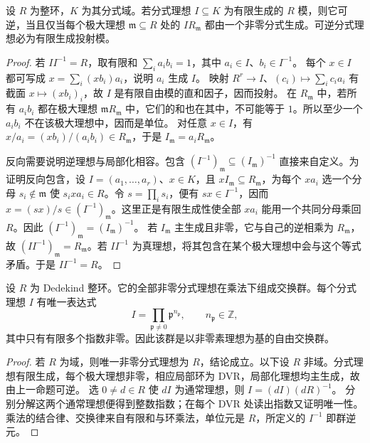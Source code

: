 \begin{proposition}\label{b3:prop:invertible-local-principal}
	设 \(R\) 为整环，\(K\) 为其分式域。若分式理想 \(I\subseteq K\) 为有限生成的 \(R\) 模，则它可逆，当且仅当每个极大理想 \(\mathfrak m\subseteq R\) 处的 \(IR_{\mathfrak m}\) 都由一个非零分式生成。可逆分式理想必为有限生成投射模。
\end{proposition}
\begin{proof}
	若 \(II^{-1}=R\)，取有限和 \(\sum_i a_ib_i=1\)，其中 \(a_i\in I\)、\(b_i\in I^{-1}\)。 每个 \(x\in I\) 都可写成 \(x=\sum_i (xb_i)a_i\)，说明 \(a_i\) 生成 \(I\)。 映射 \(R^r\rightarrow I\)、\((c_i)\mapsto\sum_i c_ia_i\) 有截面 \(x\mapsto(xb_i)_i\)，故 \(I\) 是有限自由模的直和因子，因而投射。 在 \(R_{\mathfrak m}\) 中，若所有 \(a_ib_i\) 都在极大理想 \(\mathfrak mR_{\mathfrak m}\) 中，它们的和也在其中，不可能等于 \(1\)。所以至少一个 \(a_ib_i\) 不在该极大理想中，因而是单位。 对任意 \(x\in I\)，有 \(x/a_i=(xb_i)/(a_ib_i)\in R_{\mathfrak m}\)，于是 \(I_{\mathfrak m}=a_iR_{\mathfrak m}\)。

	反向需要说明逆理想与局部化相容。包含 \((I^{-1})_{\mathfrak m}\subseteq(I_{\mathfrak m})^{-1}\) 直接来自定义。为证明反向包含，设 \(I=(a_1,\ldots,a_r)\)、\(x\in K\)，且 \(xI_{\mathfrak m}\subseteq R_{\mathfrak m}\)，为每个 \(xa_i\) 选一个分母 \(s_i\notin\mathfrak m\) 使 \(s_ix a_i\in R\)。令 \(s=\prod_i s_i\)，便有 \(sx\in I^{-1}\)，因而 \(x=(sx)/s\in(I^{-1})_{\mathfrak m}\)。这里正是有限生成性使全部 \(xa_i\) 能用一个共同分母乘回 \(R\)。因此 \((I^{-1})_{\mathfrak m}=(I_{\mathfrak m})^{-1}\)。 若 \(I_{\mathfrak m}\) 主生成且非零，它与自己的逆相乘为 \(R_{\mathfrak m}\)，故 \((II^{-1})_{\mathfrak m}=R_{\mathfrak m}\)。若 \(II^{-1}\) 为真理想，将其包含在某个极大理想中会与这个等式矛盾。于是 \(II^{-1}=R\)。
\end{proof}

\begin{corollary}\label{b3:cor:dedekind-fractional-group}
	设 \(R\) 为 Dedekind 整环。它的全部非零分式理想在乘法下组成交换群。每个分式理想 \(I\) 有唯一表达式
	\[
		I=\prod_{\mathfrak p\ne0}\mathfrak p^{n_{\mathfrak p}}, \qquad n_{\mathfrak p}\in\mathbb Z,
	\]
	其中只有有限多个指数非零。因此该群是以非零素理想为基的自由交换群。
\end{corollary}
\begin{proof}
	若 \(R\) 为域，则唯一非零分式理想为 \(R\)，结论成立。以下设 \(R\) 非域。分式理想有限生成，每个极大理想非零，相应局部环为 DVR，局部化理想均主生成，故由上一命题可逆。 选 \(0\ne d\in R\) 使 \(dI\) 为通常理想，则 \(I=(dI)(dR)^{-1}\)。 分别分解这两个通常理想便得到整数指数；在每个 DVR 处读出指数又证明唯一性。乘法的结合律、交换律来自有限和与环乘法，单位元是 \(R\)，所定义的 \(I^{-1}\) 即群逆元。
\end{proof}

